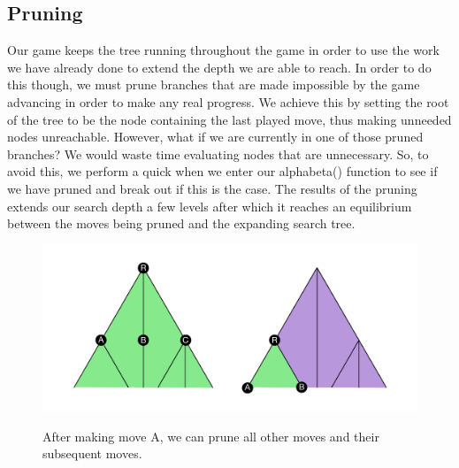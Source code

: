 \documentclass[a4paper, 12pt]{article}
\begin{document}
\begin{figure}[!h]
\centering
{}
\end{figure}
\subsection{Pruning}
Our game keeps the tree running throughout the game in order to use the work we have already done to extend the depth we are able to reach. In order to do this though, we must prune branches that are made impossible by the game advancing in order to make any real progress. We achieve this by setting the root of the tree to be the node containing the last played move, thus making unneeded nodes unreachable. However, what if we are currently in one of those pruned branches? We would waste time evaluating nodes that are unnecessary. So, to avoid this, we perform a quick when we enter our alphabeta() function to see if we have pruned and break out if this is the case. The results of the pruning extends our search depth a few levels after which it reaches an equilibrium between the moves being pruned and the expanding search tree.
\begin{figure}[h!]
  \centering
  	\includegraphics[width = 17cm]{TreePruning}\\
  \caption{After making move A, we can prune all other moves and their subsequent moves.}
\end{figure}
\end{document}
